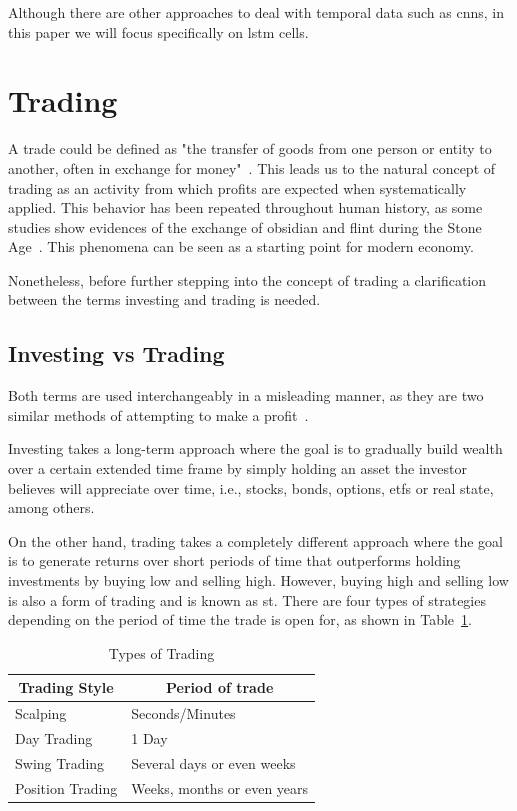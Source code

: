 Although there are other approaches to deal with temporal data such as \glspl{cnn}, in this paper we will focus specifically on \gls{lstm} cells.

\section{Trading}

A trade could be defined as "the transfer of goods from one person or entity to another, often in exchange for money"~\cite{tradeDefinition}. This leads us to the natural concept of trading as an activity from which profits are expected when systematically applied. This behavior has been repeated throughout human history, as some studies show evidences of the exchange of obsidian and flint during the Stone Age~\cite{oxfordArcheology,obsidianTrade}. This phenomena can be seen as a starting point for modern economy.

Nonetheless, before further stepping into the concept of trading a clarification between the terms investing and trading is needed.

\subsection{Investing vs Trading}

Both terms are used interchangeably in a misleading manner, as they are two similar methods of attempting to make a profit~\cite{investingVsTrading}.

Investing takes a long-term approach where the goal is to gradually build wealth over a certain extended time frame by simply holding an asset the investor believes will appreciate over time, i.e., stocks, bonds, options, \glspl{etf} or real state, among others.

On the other hand, trading takes a completely different approach where the goal is to generate returns over short periods of time that outperforms holding investments by buying low and selling high. However, buying high and selling low is also a form of trading and is known as \gls{st}. There are four types of strategies depending on the period of time the trade is open for, as shown in Table~\ref{tab:types-trading}.

\begin{table}[h]
\caption{\label{tab:types-trading} Types of Trading}
\centering
\begin{tabular}{@{}|l|l|@{}}
    \toprule
    \multicolumn{1}{|c|}{\textbf{Trading Style}} & \multicolumn{1}{c|}{\textbf{Period of trade}} \\ \midrule
        Scalping         & Seconds/Minutes             \\
        Day Trading      & 1 Day                       \\
        Swing Trading    & Several days or even weeks  \\
        Position Trading & Weeks, months or even years \\ \bottomrule
\end{tabular}
\end{table}

